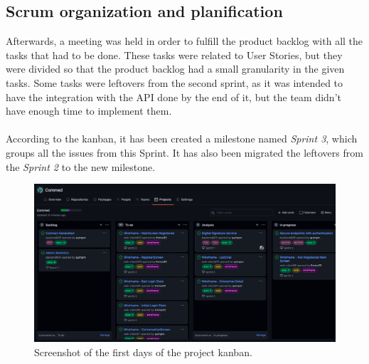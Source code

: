 \documentclass[./main.tex]{subfiles}
\begin{document}
\subsection{Scrum organization and planification}
Afterwards, a meeting was held in order to fulfill the product backlog
with all the tasks that had to be done. These tasks were related to User
Stories, but they were divided so that the product backlog had a small
granularity in the given tasks. Some tasks were leftovers from the second sprint, as 
it was intended to have the integration with the API done by the end of it, but 
the team didn't have enough time to implement them.
\\
\\
According to the kanban, it has been created a milestone named \textit{Sprint  3}, which groups all the issues from this Sprint. It has also been migrated the leftovers from the \textit{Sprint 2} to the new milestone.
\begin{figure}[H]
	\includegraphics[width=15cm]{img/kanban.png}
	\caption{Screenshot of the first days of the project kanban.}
\end{figure}
\end{document}
